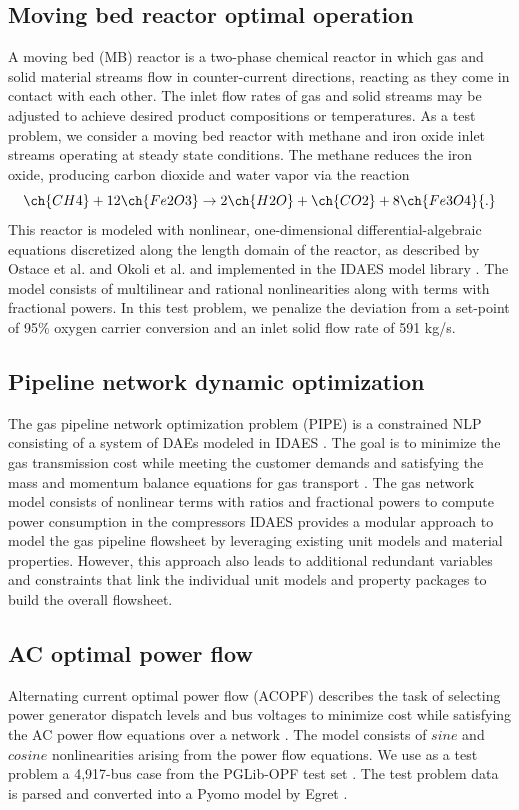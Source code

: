 \documentclass[smallextended]{svjour3}
\newcommand{\rev}[1]{{#1}}
\begin{document}
\subsection{Moving bed reactor optimal operation}
A moving bed (MB) reactor is a two-phase chemical reactor in which gas and solid material
streams flow in counter-current directions, reacting as they come in contact with
each other. The inlet flow rates of gas and solid streams may be adjusted to achieve
desired product compositions or temperatures. As a test problem, we consider a moving
bed reactor with methane and iron oxide inlet streams operating at steady state conditions.
The methane reduces the iron oxide, producing carbon dioxide and water vapor via the
reaction
\begin{equation*}
  \ch{CH4} + 12\ch{Fe2O3} \rightarrow 2\ch{H2O} + \ch{CO2} + 8\ch{Fe3O4}\rev{.}
\end{equation*}
This reactor is modeled with nonlinear, one-dimensional differential-algebraic equations
discretized along the length domain of the reactor, as described by Ostace et al.
\cite{ostace2018} and Okoli et al. \cite{okoli2020} and implemented in the IDAES
model library \cite{lee2021idaes}. \rev{The model consists of multilinear and rational nonlinearities along with terms with fractional powers.}
In this test problem, we penalize the deviation from a set-point of 95\% oxygen
carrier conversion and an inlet solid flow rate of 591 kg/s.

\subsection{Pipeline network dynamic optimization}
The gas pipeline network optimization problem (PIPE) is a constrained NLP consisting of a
system of DAEs modeled in IDAES \cite{lee2021idaes}. The goal is to minimize the gas
transmission cost while meeting the customer demands and satisfying the mass and momentum
balance equations for gas transport \cite{NAIK20231847}. \rev{The gas network model consists of nonlinear terms with ratios and fractional powers to compute power consumption in the compressors}
IDAES provides a modular approach
to model the gas pipeline flowsheet by leveraging existing unit models and material
properties. However, this approach also leads to additional redundant variables and
constraints that link the individual unit models and property packages to build the
overall flowsheet. 

\subsection{AC optimal power flow}
Alternating current optimal power flow (ACOPF) describes the task of selecting power
generator dispatch levels and bus voltages to minimize cost while satisfying the AC
power flow equations over a network \cite{cain2012}. \rev{The model consists of $sine$ and $cosine$ nonlinearities arising from the power flow equations.}
We use as a test problem a
4,917-bus case from the PGLib-OPF test set \cite{pglib}. The test problem data is
parsed and converted into a Pyomo model by Egret \cite{knueven2019}.
\end{document}
